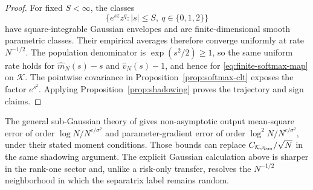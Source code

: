 \documentclass[11pt]{article}
\begin{document}
\begin{proof}
For fixed \(S<\infty\), the classes
\[
\{e^{sz}z^q:|s|\le S,\ q\in\{0,1,2\}\}
\]
have square-integrable Gaussian envelopes and are finite-dimensional smooth
parametric classes.  Their empirical averages therefore converge uniformly
at rate \(N^{-1/2}\).  The population denominator is
\(\exp(s^2/2)\ge1\), so the same uniform rate holds for
\(\widehat m_N(s)-s\) and \(\widehat v_N(s)-1\), and hence for
\eqref{eq:finite-softmax-map} on \(\mathcal K\).  The pointwise covariance in
Proposition~\ref{prop:softmax-clt} exposes the factor \(e^{s^2}\).
Applying Proposition~\ref{prop:shadowing} proves the trajectory and sign
claims.
\end{proof}

The general sub-Gaussian theory of \citet{boursier2026softmax} gives
non-asymptotic output mean-square error of order
\(\log N/N^{c/\sigma^2}\) and parameter-gradient error of order
\(\log^2N/N^{c/\sigma^2}\), under their stated moment conditions.  Those
bounds can replace \(C_{\mathcal K,\eta_{\rm sm}}/\sqrt N\) in the same
shadowing argument.  The explicit Gaussian calculation above is sharper in
the rank-one sector and, unlike a risk-only transfer, resolves the
\(N^{-1/2}\) neighborhood in which the separatrix label remains random.
\end{document}
